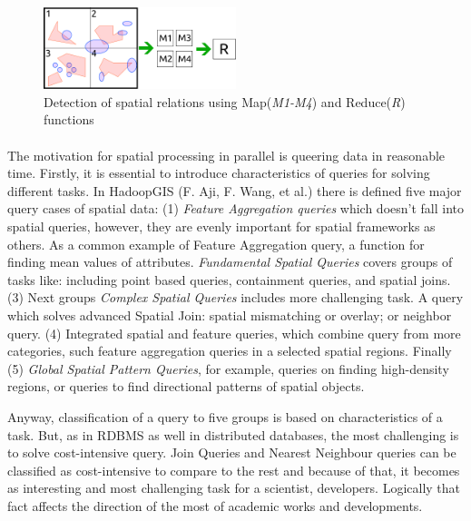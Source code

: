 \documentclass[a4paper,12pt,oneside]{report}
\begin{document}
\begin{figure}[h!]
    \centering
    \includegraphics[width=0.5\textwidth]{./img/mapred_spatial.pdf}
    \caption[Spatial Map Reduce]{\centering Detection of spatial relations using Map(\textit{M1-M4}) and Reduce(\textit{R}) functions}
        \label{fig:mapred_spatial}
 \end{figure}
\paragraph{}

The motivation for spatial processing in parallel is queering data in reasonable time. 
Firstly, it is essential to introduce characteristics of queries for solving different 
tasks. In HadoopGIS (F. Aji, F. Wang, et al.\cite{hadoopGIS}) there is defined five major 
query cases of spatial data: (1) \textit{Feature Aggregation queries}  which doesn’t 
fall into spatial queries, however, they are evenly important for spatial frameworks 
as others. As a common example of Feature Aggregation query, a function for finding mean 
values of attributes. 
\textit{Fundamental Spatial Queries} covers groups of tasks like: including point based 
queries, containment queries, and spatial joins. (3) Next groups 
\textit{ Complex Spatial Queries} includes more challenging task. A query which solves 
advanced Spatial Join: spatial mismatching or overlay; or neighbor query. (4) Integrated 
spatial and feature queries, which combine query from more categories, such feature 
aggregation queries in a selected spatial regions. Finally (5) \textit{Global
Spatial Pattern Queries}, for example, queries on finding high-density regions, or 
queries to find directional patterns of spatial objects.

Anyway, classification of a query to five groups is based on characteristics of a task. 
But, as in RDBMS as well in distributed databases, the most challenging is to solve  cost-intensive query. 
Join Queries and Nearest Neighbour queries can be classified as 
cost-intensive to compare to the rest and because of that, it becomes as interesting and
most challenging task for a scientist, developers. Logically that fact affects the direction of the most of academic works and developments.
\end{document}
